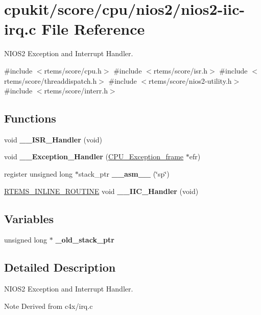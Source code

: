 \hypertarget{nios2-iic-irq_8c}{}\section{cpukit/score/cpu/nios2/nios2-\/iic-\/irq.c File Reference}
\label{nios2-iic-irq_8c}


N\+I\+O\+S2 Exception and Interrupt Handler.  


{\ttfamily \#include $<$rtems/score/cpu.\+h$>$}\newline
{\ttfamily \#include $<$rtems/score/isr.\+h$>$}\newline
{\ttfamily \#include $<$rtems/score/threaddispatch.\+h$>$}\newline
{\ttfamily \#include $<$rtems/score/nios2-\/utility.\+h$>$}\newline
{\ttfamily \#include $<$rtems/score/interr.\+h$>$}\newline
\subsection*{Functions}
\begin{DoxyCompactItemize}
\item 
\mbox{\label{nios2-iic-irq_8c_a39a322ffab4894ca65537d0f8113954d}} 
void {\bfseries \+\_\+\+\_\+\+I\+S\+R\+\_\+\+Handler} (void)
\item 
\mbox{\label{nios2-iic-irq_8c_a418351bc715adf3c207ef75d78c2b09a}} 
void {\bfseries \+\_\+\+\_\+\+Exception\+\_\+\+Handler} (\mbox{\hyperlink{structCPU__Exception__frame}{C\+P\+U\+\_\+\+Exception\+\_\+frame}} $\ast$efr)
\item 
\mbox{\label{nios2-iic-irq_8c_aa67227357a94a6ad013a7178fa39cdb1}} 
register unsigned long $\ast$stack\+\_\+ptr {\bfseries \+\_\+\+\_\+asm\+\_\+\+\_\+} (\char`\"{}sp\char`\"{})
\item 
\mbox{\label{nios2-iic-irq_8c_af19f769c094aadfa1f682136877441bc}} 
\mbox{\hyperlink{group__RTEMSScoreBaseDefs_gac216239df231d5dbd15e3520b0b9313f}{R\+T\+E\+M\+S\+\_\+\+I\+N\+L\+I\+N\+E\+\_\+\+R\+O\+U\+T\+I\+NE}} void {\bfseries \+\_\+\+\_\+\+I\+I\+C\+\_\+\+Handler} (void)
\end{DoxyCompactItemize}
\subsection*{Variables}
\begin{DoxyCompactItemize}
\item 
\mbox{\label{nios2-iic-irq_8c_aaccd45e5eb767c5dd9cb52943d05e41c}} 
unsigned long $\ast$ {\bfseries \+\_\+old\+\_\+stack\+\_\+ptr}
\end{DoxyCompactItemize}


\subsection{Detailed Description}
N\+I\+O\+S2 Exception and Interrupt Handler. 

\begin{DoxyNote}{Note}
Derived from c4x/irq.\+c 
\end{DoxyNote}

